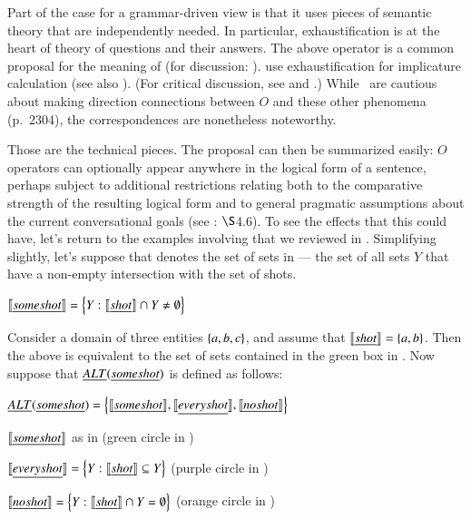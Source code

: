 \documentclass[leqno,12pt]{article}
\begin{document}
Part of the case for a grammar-driven view is that it uses pieces of
semantic theory that are independently needed. In particular,
exhaustification is at the heart of  theory
of questions and their answers. The above operator is a common
proposal for the meaning of  (for discussion:
\citealt{Rooth96,Buring01,BeaverClark08}).  \citet{SchulzVanRooij06}
use exhaustification for implicature calculation (see also
\citealt{deJagerVanRooij07}).  (For critical discussion, see
\citealt{Alonso-Ovalle:2008} and \citealt{Gajewski:2012}.) While \CFS\
are cautious about making direction connections between $O$ and these
other phenomena (p.~2304), the correspondences are nonetheless
noteworthy.


Those are the technical pieces. The proposal can then be summarized
easily: $O$ operators can optionally appear anywhere in the logical
form of a sentence, perhaps subject to additional restrictions
relating both to the comparative strength of the resulting logical
form and to general pragmatic assumptions about the current
conversational goals (see \CFS: $\S$4.6). To see the effects that this
could have, let's return to the examples involving \word{some} that we
reviewed in \secref{sec:implicature}. Simplifying slightly, let's
suppose that \word{some shot} denotes the set of sets in 
--- the set of all sets $Y$ that have a non-empty intersection with
the set of shots.
%
\begin{examples}
\item\label{someshot} $\llbracket\emph{some shot}\rrbracket = \left\{ Y : \llbracket\emph{shot}\rrbracket \cap Y \neq \emptyset \right\}$
\end{examples}
%
Consider a domain of three entities $\left\{ a,b,c \right\}$, and assume that
$\llbracket\emph{shot}\rrbracket = \left\{ a,b \right\}$. Then the above is equivalent to the
set of sets contained in the green box in \figref{fig:qspace}. Now suppose that
$\emph{ALT}(\emph{some shot})$ is defined as follows:
%
\begin{examples}
\item\label{altsome} $\emph{ALT}(\emph{some shot}) =  
  \left\{ 
    \llbracket\emph{some shot}\rrbracket, 
    \llbracket\emph{every shot}\rrbracket, 
    \llbracket\emph{no shot}\rrbracket
   \right\}$
  \begin{examples}
  \item $\llbracket\emph{some shot}\rrbracket$ as in  \hfill (green circle in )
  \item $\llbracket\emph{every shot}\rrbracket = \left\{ Y : \llbracket\emph{shot}\rrbracket \subseteq Y \right\}$ \hfill (purple circle in )
  \item $\llbracket\emph{no shot}\rrbracket = \left\{ Y : \llbracket\emph{shot}\rrbracket \cap Y = \emptyset \right\}$  \hfill (orange circle in )
  \end{examples}
\end{examples}
\end{document}
